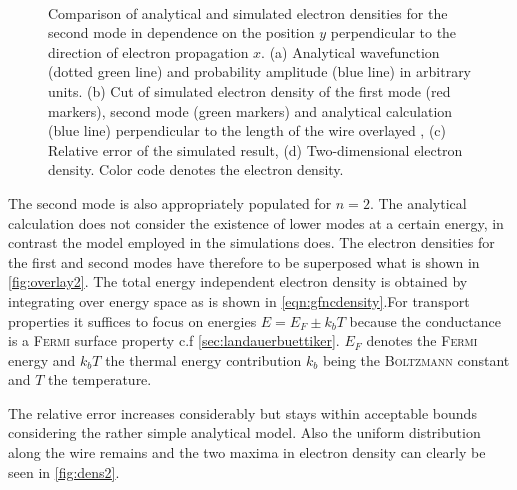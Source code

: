 \begin{figure}[h]
  \begin{center}
 \qquad
    \\
    \qquad
    \caption{Comparison of analytical and simulated electron densities for the second mode in dependence on the position $y$ perpendicular to the direction of electron propagation $x$. (a) Analytical wavefunction (dotted green line) and probability amplitude (blue line) in arbitrary units. (b) Cut of simulated electron density of the first mode (red markers), second mode (green markers) and analytical calculation (blue line) perpendicular to the length of the wire overlayed , (c) Relative error of the simulated result, (d) Two-dimensional electron density. Color code denotes the electron density.}
  \end{center}
\end{figure}
The second mode is also appropriately populated for $n=2$. The analytical calculation does not consider the existence of lower modes at a certain energy, in contrast the model employed in the simulations does. The electron densities for the first and second modes have therefore to be superposed what is shown in \cref{fig:overlay2}. The total energy independent electron density is obtained by integrating over energy space as is shown in \cref{eqn:gfncdensity}.For transport properties it suffices to focus on energies $E=E_F\pm k_bT$ because the conductance is a \textsc{Fermi} surface property c.f \cref{sec:landauerbuettiker}. $E_F$ denotes the \textsc{Fermi} energy and $k_bT$ the thermal energy contribution $k_b$ being the \textsc{Boltzmann} constant and $T$ the temperature.\par
The relative error increases considerably but stays within acceptable bounds considering the rather simple analytical model.
Also the uniform distribution along the wire remains and the two maxima in electron density can clearly be seen in \cref{fig:dens2}.\par
